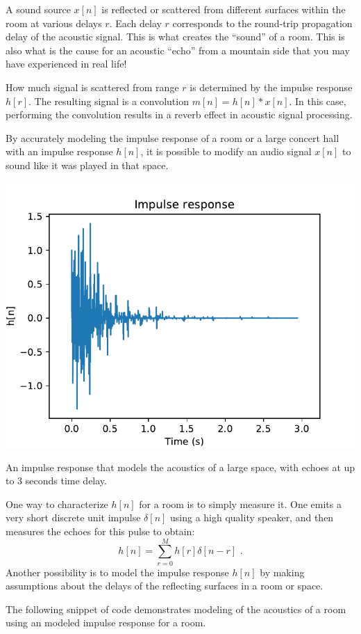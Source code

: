 A sound source $x[n]$ is reflected or scattered from different
surfaces within the room at various delays $r$. Each delay $r$
corresponds to the round-trip propagation delay of the acoustic
signal. This is what creates the ``sound'' of a room. This is also
what is the cause for an acoustic ``echo'' from a mountain side that
you may have experienced in real life!

How much signal is scattered from range $r$ is determined by the impulse
response $h[r]$. The resulting signal is a convolution $m[n] = h[n]*
x[n]$. In this case, performing the convolution results in a reverb
effect in acoustic signal processing. 

By accurately modeling the impulse response of a room or a large
concert hall with an impulse response $h[n]$, it is possible to modify
an audio signal $x[n]$ to sound like it was played in that space.

\begin{marginfigure}
\begin{center}
\includegraphics[width=\textwidth]{ch10/figures/reverb.pdf}
\end{center}
\caption{An impulse response that models the acoustics of a large space, with echoes at up to 3 seconds time delay.}
\label{fig:room_model}
\end{marginfigure}


One way to characterize $h[n]$ for a room is to simply measure it. One
emits a very short discrete unit impulse $\delta[n]$ using a high
quality speaker, and then measures the echoes for this pulse to
obtain:
\begin{equation}
h[n] = \sum_{r=0}^M h[r]\delta[n-r]\,\,.
\end{equation}
Another possibility is to model the impulse response $h[n]$ by making
assumptions about the delays of the reflecting surfaces in a room or
space.

The following snippet of code demonstrates modeling of the acoustics
of a room using an modeled impulse response for a room.



